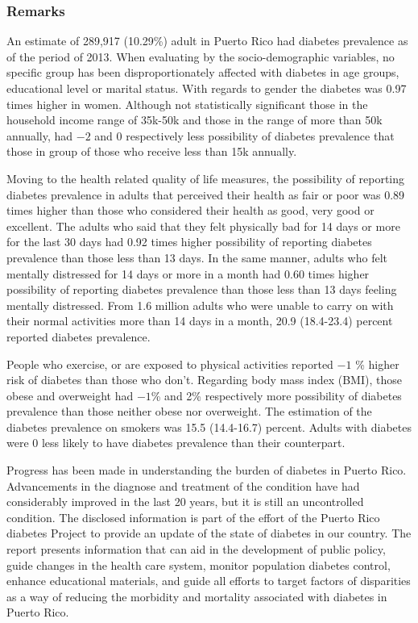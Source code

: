 \subsubsection{Remarks}

An estimate of 289,917 
(10.29\%) adult in Puerto Rico had diabetes prevalence as of the period of 2013.
When evaluating by the socio-demographic variables, no specific group has been disproportionately affected with diabetes in age groups, educational level or marital status. With regards to gender the diabetes was 0.97 times higher in women. Although not statistically significant those in the household income range of 35k-50k and those in the range of more than 50k annually, had \ensuremath{-2} and 0 respectively less possibility of diabetes prevalence that those  in group of those who receive less than 15k annually.

Moving to the health related quality of life measures, the possibility of reporting diabetes prevalence in adults that perceived their health as fair or poor was 0.89 times higher than those who considered their health as good, very good or excellent. The adults who said that they felt physically bad for 14 days or more for the last 30 days had 0.92 times higher possibility of reporting diabetes prevalence than those less than 13 days. In the same manner, adults who felt mentally distressed for 14 days or more in a month had 0.60 times higher possibility of reporting diabetes prevalence than those less than 13 days feeling mentally distressed. From 1.6 million adults who were unable to carry on with their normal activities more than 14 days in a month, 20.9 (18.4-23.4) percent reported diabetes prevalence. 

People who exercise, or are exposed to physical activities reported \ensuremath{-1} \% higher risk of diabetes than those who don't.  Regarding body mass index (BMI), those obese and overweight had \ensuremath{-1}\% and 2\% respectively more possibility of diabetes prevalence than those neither obese nor overweight. The estimation of the diabetes prevalence on smokers was 15.5 (14.4-16.7) percent.  Adults with diabetes were 0\5 less likely to have diabetes prevalence than their counterpart.



Progress has been made in understanding the burden of diabetes in Puerto Rico. Advancements in the diagnose and treatment of the condition have had considerably improved in the last 20 years, but it is still an uncontrolled condition. The disclosed information is part of the effort of the Puerto Rico diabetes Project to provide an update of the state of diabetes in our country. The report presents information that can aid in the development of public policy, guide changes in the health care system, monitor population diabetes control, enhance educational materials, and guide all efforts to target factors of disparities as a way of reducing the morbidity and mortality associated with diabetes in Puerto Rico.

